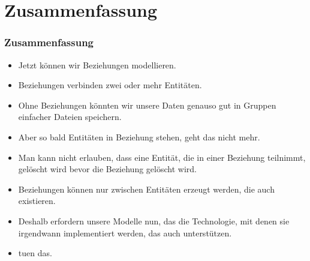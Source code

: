 \documentclass[aspectratio=169,mathserif,notheorems]{beamer}%
\begin{document}
\section{Zusammenfassung}%
%
\begin{frame}%
\frametitle{Zusammenfassung}%
\begin{itemize}%
\item Jetzt können wir Beziehungen modellieren.%
\item<2-> Beziehungen verbinden zwei oder mehr Entitäten.%
\item<3-> Ohne Beziehungen könnten wir unsere Daten genauso gut in Gruppen einfacher Dateien speichern.%
\item<4-> Aber so bald Entitäten in Beziehung stehen, geht das nicht mehr.%
\item<5-> Man kann nicht erlauben, dass eine Entität, die in einer Beziehung teilnimmt, gelöscht wird bevor die Beziehung gelöscht wird.%
\item<6-> Beziehungen können nur zwischen Entitäten erzeugt werden, die auch existieren.%
\item<7-> Deshalb erfordern unsere Modelle nun, das die Technologie, mit denen sie irgendwann implementiert werden, das auch unterstützen.%
\item<8->  tuen das.%
\end{itemize}%
\end{frame}%
%
\endPresentation%
\end{document}
